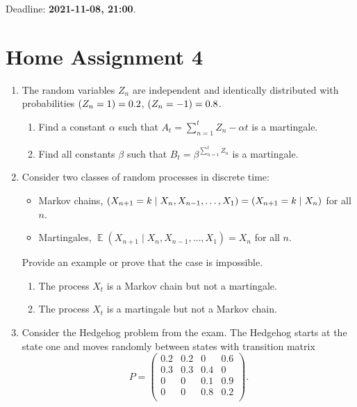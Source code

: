 \documentclass[12pt]{article}
\DeclareMathOperator{\Cov}{\mathbb{C}ov}
\let\P\relax
\DeclareMathOperator{\P}{\mathbb{P}}
\DeclareMathOperator{\E}{\mathbb{E}}
\begin{document}
Deadline: \textbf{2021-11-08, 21:00}. 


\newpage

\section*{Home Assignment 4}

\begin{enumerate}

  \item The random variables $Z_n$ are independent and identically distributed with probabilities $\P(Z_n = 1) = 0.2$, 
  $\P(Z_n = -1) = 0.8$. 
  \begin{enumerate}
    \item Find a constant $\alpha$ such that $A_t = \sum_{n=1}^t Z_n - \alpha t$ is a martingale.
    \item Find all constants $\beta$ such that $B_t = \beta^{\sum_{n=1}^t Z_n}$ is a martingale.
  \end{enumerate}


  \item Consider two classes of random processes in discrete time:
  \begin{itemize}
    \item Markov chains, $\P(X_{n+1} = k \mid X_{n}, X_{n-1}, \ldots, X_1) = \P(X_{n+1} = k \mid X_{n})$ for all $n$.
    \item Martingales, $\E(X_{n+1} \mid X_{n}, X_{n-1}, \ldots, X_1 ) = X_n$ for all $n$.
  \end{itemize}

  Provide an example or prove that the case is impossible.
  \begin{enumerate}
    \item The process $X_t$ is a Markov chain but not a martingale.
    \item The process $X_t$ is a martingale but not a Markov chain. 
  \end{enumerate}

  \item Consider the Hedgehog problem from the exam. 
  The Hedgehog starts at the state one and moves randomly between states with transition matrix
  \[
    P = \begin{pmatrix}
      0.2 & 0.2 & 0 & 0.6 \\
      0.3 & 0.3 & 0.4 & 0 \\
      0 & 0 & 0.1 & 0.9 \\
      0 & 0 & 0.8 & 0.2 \\
    \end{pmatrix}.
  \]


\end{enumerate}
\end{document}
